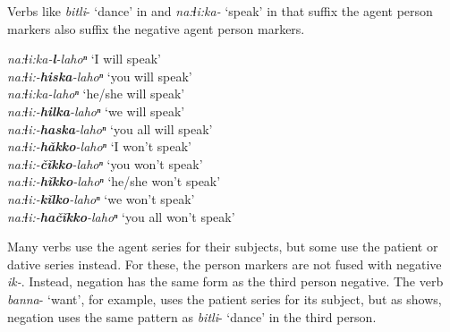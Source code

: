 \documentclass[output=paper,colorlinks,citecolor=brown]{langscibook}
\begin{document}
Verbs like \textit{bitli}- ‘dance’ in  and \textit{na:ɬi:ka-} ‘speak’ in  that suffix the agent person markers also suffix the negative agent person markers. 


\ea\label{ex:koa:14}
    \textit{na:ɬi:ka-\textbf{l}-lahoⁿ} \tab ‘I will speak’ \\
    \textit{na:ɬi:-\textbf{hiska}-lahoⁿ} \tab ‘you will speak’ \\
    \textit{na:ɬi:ka-lahoⁿ} \tab ‘he/she will speak’ \\
    \textit{na:ɬi:-\textbf{hilka}-lahoⁿ} \tab ‘we will speak’ \\
    \textit{na:ɬi:-\textbf{haska}-lahoⁿ} \tab ‘you all will speak’ \\
\vspace{2mm}
    \textit{na:ɬi:-\textbf{hǎkko}-lahoⁿ} \tab ‘I won’t speak’ \\
    \textit{na:ɬi:-\textbf{čǐkko}-lahoⁿ} \tab ‘you won’t speak’ \\
    \textit{na:ɬi:-\textbf{hǐkko}-lahoⁿ} \tab ‘he/she won’t speak’ \\
    \textit{na:ɬi:-\textbf{kǐlko}-lahoⁿ} \tab ‘we won’t speak’ \\
    \textit{na:ɬi:-\textbf{hačǐkko}-lahoⁿ} \tab ‘you all won’t speak’ \\
\z

Many verbs use the agent series for their subjects, but some use the patient or dative series instead. For these, the person markers are not fused with negative \textit{ik-}. Instead, negation has the same form as the third person negative. The verb \textit{banna}- ‘want’, for example, uses the patient series for its subject, but as  shows, negation uses the same pattern as \textit{bitli}- ‘dance’ in the third person.
\end{document}
